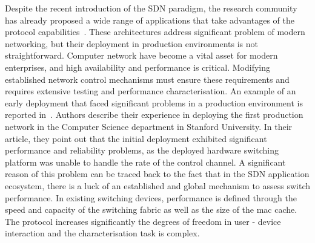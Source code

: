 



Despite the recent introduction of the SDN paradigm, the research community
has already proposed a wide range of applications that take advantages of the
protocol capabilities~\cite{plug_n_serv,difane,flowvisor-osdi}. These
architectures address significant problem of modern networking, but their
deployment in production environments is not straightforward.  Computer network
have become a vital asset for modern enterprises, and high availability and
performance is critical. Modifying
established network control mechanisms must ensure these requirements and 
requires extensive testing and
performance characterisation.  An example of an early \of deployment that faced significant
problems in a production environment is reported in~\cite{Weissmann:va}. Authors
describe their experience in deploying the first \of production network in the
Computer Science department in Stanford University. In their article, they point
out that the initial deployment exhibited significant performance and
reliability problems, as the deployed hardware switching platform was unable to
handle the rate of the control channel. A significant reason of this problem can
be traced back to the fact that in the SDN application ecosystem, there is a
luck of an established and global mechanism to assess switch performance.
In existing switching devices, performance is defined through
the speed and capacity of the switching fabric as well as the size of the mac
cache. 
The \of protocol increases significantly the degrees of freedom in user - device 
interaction and the characterisation task is complex. 

